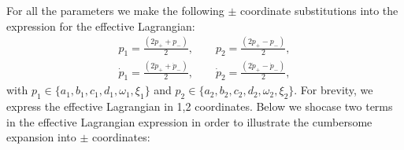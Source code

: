 For all the parameters we make the following $\pm$ coordinate substitutions into the expression for the effective Lagrangian:
\begin{align}
p_1 = \frac{(2p_+ + p_-)}{2},   \quad \quad
p_2 = \frac{(2p_+ - p_-)}{2}, \\
\dot{p}_1 = \frac{(2\dot{p}_+ + \dot{p}_-)}{2},  \quad \quad
\dot{p}_2 = \frac{(2\dot{p}_+ - \dot{p}_-)}{2},
\end{align}
with $p_1 \in \{ a_1,  b_1, c_1, d_1, \omega_1, \xi_1\}$ and $p_2 \in \{ a_2, b_2, c_2, d_2, \omega_2, \xi_2\}$.
For brevity, we express the effective Lagrangian in 1,2 coordinates.  Below we shocase two terms in the effective Lagrangian expression in order to illustrate the cumbersome expansion into $\pm$ coordinates:
